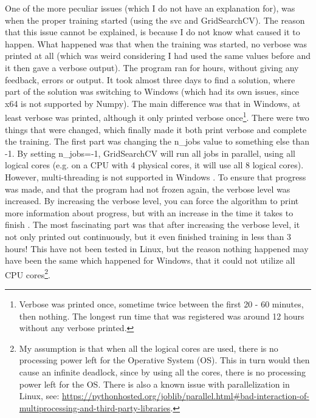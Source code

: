 \vspace{0.5em}\newline
One of the more peculiar issues (which I do not have an explanation for), was when the proper training started (using the \gls{svc} and GridSearchCV).
The reason that this issue cannot be explained, is because I do not know what caused it to happen.
What happened was that when the training was started, no verbose was printed at all (which was weird considering I had used the same values before and it then gave a verbose output). 
The program ran for hours, without giving any feedback, errors or output. 
\vspace{0.5em}\newline
It took almost three days to find a solution, where part of the solution was switching to Windows (which had its own issues, since x64 is not supported by Numpy).
The main difference was that in Windows, at least verbose was printed, although it only printed verbose once\footnote{
	Verbose was printed once, sometime twice between the first 20 - 60 minutes, then nothing.
	The longest run time that was registered was around 12 hours without any verbose printed.
}.
There were two things that were changed, which finally made it both print verbose and complete the training.
The first part was changing the n\_jobs value to something else than -1. 
By setting n\_jobs=-1, GridSearchCV will run all jobs in parallel, using all logical cores (e.g. on a CPU with 4 physical cores, it will use all 8 logical cores). 
However, multi-threading is not supported in Windows \cite{GS2015}. 
To ensure that progress was made, and that the program had not frozen again, the verbose level was increased.
By increasing the verbose level, you can force the algorithm to print more information about progress, but with an increase in the time it takes to finish \cite{Manuel2015, user29912432014}. 
The most fascinating part was that after increasing the verbose level, it not only printed out continuously, but it even finished training in less than 3 hours!
This have not been tested in Linux, but the reason nothing happened may have been the same which happened for Windows, that it could not utilize all CPU cores\footnote{
	My assumption is that when all the logical cores are used, there is no processing power left for the Operative System (OS). 
	This in turn would then cause an infinite deadlock, since by using all the cores, there is no processing power left for the OS.
	There is also a known issue with parallelization in Linux, see: 
	\url{https://pythonhosted.org/joblib/parallel.html\#bad-interaction-of-multiprocessing-and-third-party-libraries}.
}.
